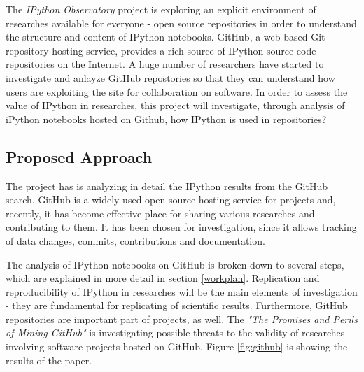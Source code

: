 The \textit{IPython Observatory} project is exploring an explicit environment of researches available for everyone - open source repositories in order to understand the structure and content of IPython notebooks. GitHub, a web-based Git repository hosting service, provides a rich source of IPython source code repositories on the Internet.\cite{gitHubWiki} A huge number of researchers have started to investigate and anlayze GitHub repostories so that they can understand how users are exploiting the site for collaboration on software. \cite{kalliamvakou2007promises} In order to assess the value of IPython in researches, this project will investigate, through analysis of iPython notebooks hosted on Github, how IPython is used in repositories?

\subsection{Proposed Approach}

The project has is analyzing in detail the IPython results from the GitHub search. GitHub is a widely used open source hosting service for projects and, recently, it has become effective place for sharing various researches and contributing to them. It has been chosen for investigation, since it allows tracking of data changes, commits, contributions and documentation. 

The analysis of IPython notebooks on GitHub is broken down to several steps, which are explained in more detail in section \ref{workplan}. Replication and reproducibility of IPython in researches will be the main elements of investigation - they are fundamental for replicating of scientific results. Furthermore, GitHub repositories are important part of projects, as well. The \textit{"The Promises and Perils of Mining GitHub"} is investigating possible threats to the validity of researches involving software projects hosted on GitHub.\cite{kalliamvakoupromises} Figure \ref{fig:github} is showing the results of the paper. 

